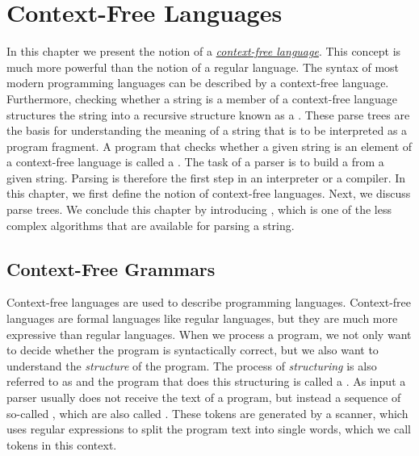\chapter{Context-Free Languages \label{chap:kontextfrei}}
In this chapter we present the notion of a
\href{http://en.wikipedia.org/wiki/Context-free_language}{\emph{context-free language}}.
This concept is much more powerful than the notion of a regular language.  The syntax of most modern
programming languages can be described by a context-free language.  Furthermore, checking whether a
string is a member of a context-free language structures the string into a recursive structure known
as a .  These parse trees are the basis for understanding the meaning of a
string that is to be interpreted as a program fragment.  A program that checks whether a given
string is an element of a context-free language is called a .  The task of a parser is to build
a  from a given string.  Parsing is therefore the first step in an interpreter or a compiler.
In this chapter, we first define the notion of context-free languages.  Next, we discuss parse
trees.  We conclude this chapter by introducing , which is one of the less complex
algorithms that are available for parsing a string.

\section{Context-Free Grammars \label{context-free}}
Context-free languages are used to describe programming languages.
Context-free languages are formal languages like regular languages, but they are much more expressive than
regular languages.
When we process a program, we not only want to
decide whether the program is syntactically correct, but we also want to understand the \emph{structure}
of the program.  The process of \emph{structuring} is also referred to as 
and the program that does this structuring is called a
.  As input a parser usually does not receive the
text of a program, but instead a sequence of so-called , which are also called
.  These tokens are generated by a scanner, which uses regular expressions to split the program text
into single words, which we call tokens in this context.

